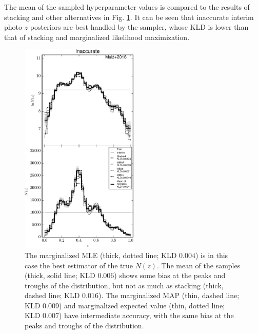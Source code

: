 \documentclass[preprint]{aastex}
\begin{document}
The mean of the sampled hyperparameter values is compared to the results of 
stacking and other alternatives in Fig. \ref{fig:noisy-comp}.  It can be seen 
that inaccurate interim photo-$z$ posteriors are best handled by the sampler, 
whose KLD is lower than that of stacking and marginalized likelihood 
maximization.


\begin{figure}
\includegraphics[width=0.5\textwidth]{figs/vars/comps.pdf}
\caption{The marginalized MLE (thick, dotted line; KLD $0.004$) is in this case 
the best estimator of the true $N(z)$.  The mean of the samples (thick, solid 
line; KLD $0.006$) shows some bias at the peaks and troughs of the 
distribution, but not as much as stacking (thick, dashed line; KLD $0.016$).  
The marginalized MAP (thin, dashed line; KLD $0.009$) and marginalized expected 
value (thin, dotted line; KLD $0.007$) have intermediate accuracy, with the 
same bias at the peaks and troughs of the distribution.}
\label{fig:noisy-comp}
\end{figure}
\end{document}
